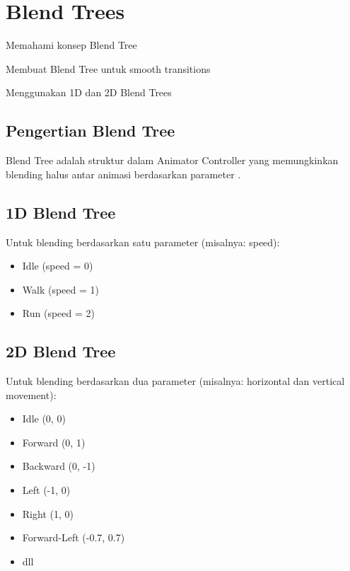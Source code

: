 
\section{Blend Trees}

\begin{learningoutcomes}
\item Memahami konsep Blend Tree
\item Membuat Blend Tree untuk smooth transitions
\item Menggunakan 1D dan 2D Blend Trees
\end{learningoutcomes}

\subsection{Pengertian Blend Tree}

\begin{definisi}
Blend Tree adalah struktur dalam Animator Controller yang memungkinkan blending halus antar animasi berdasarkan parameter \cite{UnityAnimation2024}.
\end{definisi}

\subsection{1D Blend Tree}

Untuk blending berdasarkan satu parameter (misalnya: speed):
\begin{itemize}
\item Idle (speed = 0)
\item Walk (speed = 1)
\item Run (speed = 2)
\end{itemize}

\subsection{2D Blend Tree}

Untuk blending berdasarkan dua parameter (misalnya: horizontal dan vertical movement):
\begin{itemize}
\item Idle (0, 0)
\item Forward (0, 1)
\item Backward (0, -1)
\item Left (-1, 0)
\item Right (1, 0)
\item Forward-Left (-0.7, 0.7)
\item dll
\end{itemize}

